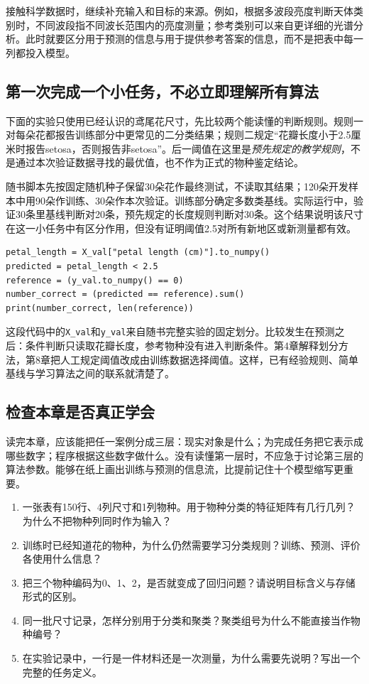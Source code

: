 接触科学数据时，继续补充输入和目标的来源。例如，根据多波段亮度判断天体类别时，不同波段指不同波长范围内的亮度测量；参考类别可以来自更详细的光谱分析。此时就要区分用于预测的信息与用于提供参考答案的信息，而不是把表中每一列都投入模型。

\subsection{第一次完成一个小任务，不必立即理解所有算法}
下面的实验只使用已经认识的鸢尾花尺寸，先比较两个能读懂的判断规则。规则一对每朵花都报告训练部分中更常见的二分类结果；规则二规定“花瓣长度小于2.5厘米时报告setosa，否则报告非setosa”。后一阈值在这里是\emph{预先规定的教学规则}，不是通过本次验证数据寻找的最优值，也不作为正式的物种鉴定结论。

随书脚本先按固定随机种子保留30朵花作最终测试，不读取其结果；120朵开发样本中用90朵作训练、30朵作本次验证。训练部分确定多数类基线。实际运行中，验证30条里基线判断对20条，预先规定的长度规则判断对30条。这个结果说明该尺寸在这一小任务中有区分作用，但没有证明阈值2.5对所有新地区或新测量都有效。

\begin{lstlisting}[caption={把已有规则应用到新的输入，类别信息只用于最后核对}]
petal_length = X_val["petal length (cm)"].to_numpy()
predicted = petal_length < 2.5
reference = (y_val.to_numpy() == 0)
number_correct = (predicted == reference).sum()
print(number_correct, len(reference))
\end{lstlisting}
这段代码中的\texttt{X\_val}和\texttt{y\_val}来自随书完整实验的固定划分。比较发生在预测之后：条件判断只读取花瓣长度，参考物种没有进入判断条件。第4章解释划分方法，第8章把人工规定阈值改成由训练数据选择阈值。这样，已有经验规则、简单基线与学习算法之间的联系就清楚了。

\subsection{检查本章是否真正学会}
读完本章，应该能把任一案例分成三层：现实对象是什么；为完成任务把它表示成哪些数字；程序根据这些数字做什么。没有读懂第一层时，不应急于讨论第三层的算法参数。能够在纸上画出训练与预测的信息流，比提前记住十个模型缩写更重要。

\chapterexercise
\begin{enumerate}
\item 一张表有150行、4列尺寸和1列物种。用于物种分类的特征矩阵有几行几列？为什么不把物种列同时作为输入？
\item 训练时已经知道花的物种，为什么仍然需要学习分类规则？训练、预测、评价各使用什么信息？
\item 把三个物种编码为0、1、2，是否就变成了回归问题？请说明目标含义与存储形式的区别。
\item 同一批尺寸记录，怎样分别用于分类和聚类？聚类组号为什么不能直接当作物种编号？
\item 在实验记录中，一行是一件材料还是一次测量，为什么需要先说明？写出一个完整的任务定义。
\end{enumerate}

